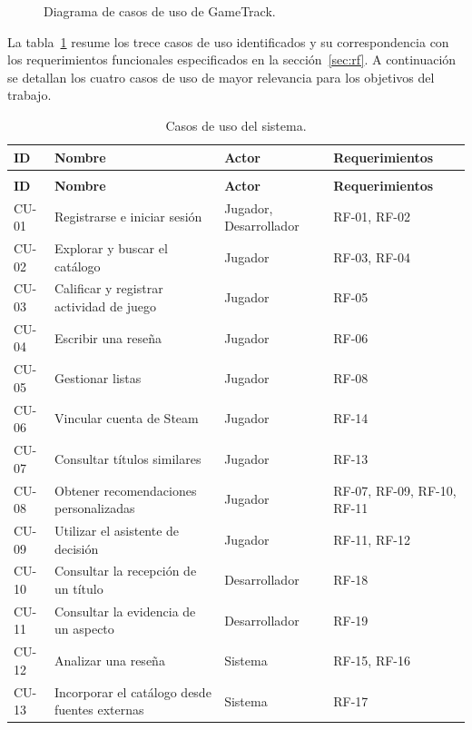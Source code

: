 \begin{figure}[ht]
	\centering
	\caption{Diagrama de casos de uso de GameTrack.}
	\label{fig:casos_uso}
\end{figure}

La tabla~\ref{tab:casos_uso} resume los trece casos de uso identificados y su correspondencia con los requerimientos funcionales especificados en la sección~\ref{sec:rf}. A continuación se detallan los cuatro casos de uso de mayor relevancia para los objetivos del trabajo.

\begin{longtable}{|>{\raggedright\arraybackslash}p{1.1cm}|>{\raggedright\arraybackslash}p{4.8cm}|>{\raggedright\arraybackslash}p{3.1cm}|>{\raggedright\arraybackslash}p{3.1cm}|}
	\caption{Casos de uso del sistema.}\label{tab:casos_uso} \\
	\hline
	\textbf{ID} & \textbf{Nombre} & \textbf{Actor} & \textbf{Requerimientos} \\
	\hline
	\endfirsthead
	\multicolumn{4}{l}{\textit{Continuación de la Tabla \ref{tab:casos_uso}}} \\
	\hline
	\textbf{ID} & \textbf{Nombre} & \textbf{Actor} & \textbf{Requerimientos} \\
	\hline
	\endhead
	\hline
	\endfoot
	\hline
	\endlastfoot
	CU-01 & Registrarse e iniciar sesión & Jugador, Desarrollador & RF-01, RF-02 \\
	CU-02 & Explorar y buscar el catálogo & Jugador & RF-03, RF-04 \\
	CU-03 & Calificar y registrar actividad de juego & Jugador & RF-05 \\
	CU-04 & Escribir una reseña & Jugador & RF-06 \\
	CU-05 & Gestionar listas & Jugador & RF-08 \\
	CU-06 & Vincular cuenta de Steam & Jugador & RF-14 \\
	CU-07 & Consultar títulos similares & Jugador & RF-13 \\
	CU-08 & Obtener recomendaciones personalizadas & Jugador & RF-07, RF-09, RF-10, RF-11 \\
	CU-09 & Utilizar el asistente de decisión & Jugador & RF-11, RF-12 \\
	CU-10 & Consultar la recepción de un título & Desarrollador & RF-18 \\
	CU-11 & Consultar la evidencia de un aspecto & Desarrollador & RF-19 \\
	CU-12 & Analizar una reseña & Sistema & RF-15, RF-16 \\
	CU-13 & Incorporar el catálogo desde fuentes externas & Sistema & RF-17 \\
\end{longtable}

